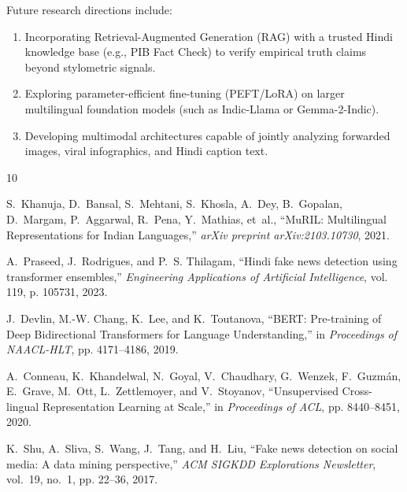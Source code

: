 \documentclass[11pt,a4paper]{article}
\begin{document}
Future research directions include:
\begin{enumerate}[leftmargin=*]
    \item Incorporating Retrieval-Augmented Generation (RAG) with a trusted Hindi knowledge base (e.g., PIB Fact Check) to verify empirical truth claims beyond stylometric signals.
    \item Exploring parameter-efficient fine-tuning (PEFT/LoRA) on larger multilingual foundation models (such as Indic-Llama or Gemma-2-Indic).
    \item Developing multimodal architectures capable of jointly analyzing forwarded images, viral infographics, and Hindi caption text.
\end{enumerate}


\begin{thebibliography}{10}

S.~Khanuja, D.~Bansal, S.~Mehtani, S.~Khosla, A.~Dey, B.~Gopalan, D.~Margam, P.~Aggarwal, R.~Pena, Y.~Mathias, et~al.,
\newblock ``MuRIL: Multilingual Representations for Indian Languages,''
\newblock \emph{arXiv preprint arXiv:2103.10730}, 2021.

A.~Praseed, J.~Rodrigues, and P.~S. Thilagam,
\newblock ``Hindi fake news detection using transformer ensembles,''
\newblock \emph{Engineering Applications of Artificial Intelligence}, vol. 119, p. 105731, 2023.

J.~Devlin, M.-W. Chang, K.~Lee, and K.~Toutanova,
\newblock ``BERT: Pre-training of Deep Bidirectional Transformers for Language Understanding,''
\newblock in \emph{Proceedings of NAACL-HLT}, pp. 4171--4186, 2019.

A.~Conneau, K.~Khandelwal, N.~Goyal, V.~Chaudhary, G.~Wenzek, F.~Guzm{\'a}n, E.~Grave, M.~Ott, L.~Zettlemoyer, and V.~Stoyanov,
\newblock ``Unsupervised Cross-lingual Representation Learning at Scale,''
\newblock in \emph{Proceedings of ACL}, pp. 8440--8451, 2020.

K.~Shu, A.~Sliva, S.~Wang, J.~Tang, and H.~Liu,
\newblock ``Fake news detection on social media: A data mining perspective,''
\newblock \emph{ACM SIGKDD Explorations Newsletter}, vol.~19, no.~1, pp. 22--36, 2017.

\end{thebibliography}
\end{document}
